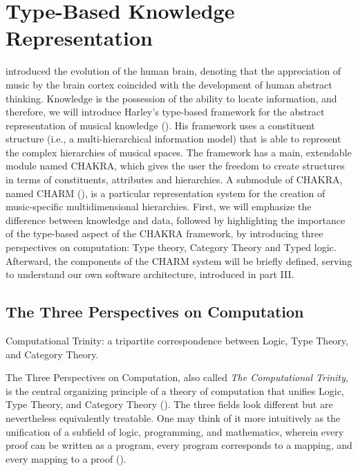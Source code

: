 \setlength{\headheight}{23.84448pt}
\addtolength{\topmargin}{-10.84448pt}

\chapter{Type-Based Knowledge Representation}
\label{chap:knowledge}

\textcite{shi_cognitive_2019} introduced the evolution of the human brain, denoting that the appreciation of music by the brain cortex coincided with the development of human abstract thinking.
Knowledge is the possession of the ability to locate information, and therefore, we will introduce Harley's type-based framework for the abstract representation of musical knowledge (\cite{harley_abstract_2020}).
His framework uses a constituent structure (i.e., a multi-hierarchical information model) that is able to represent the complex hierarchies of musical spaces. The framework has a main, extendable module named CHAKRA, which gives the user the freedom to create structures in terms of constituents, attributes and hierarchies. A submodule of CHAKRA, named CHARM (\cite{wiggins_representing_1989}), is a particular representation system for the creation of music-specific multidimensional hierarchies. First, we will emphasize the difference between knowledge and data, followed by highlighting the importance of the type-based aspect of the CHAKRA framework, by introducing three perspectives on computation: Type theory, Category Theory and Typed logic. Afterward, the components of the CHARM system will be briefly defined, serving to understand our own software architecture, introduced in part III.


\section{The Three Perspectives on Computation}

\begin{marginfigure}
    \centering
    
    \vspace{0.5cm}
    \caption{Computational Trinity: a tripartite correspondence between Logic, Type Theory, and Category Theory.}
    \label{typeTheory}
\end{marginfigure}

The Three Perspectives on Computation, also called \textit{The Computational Trinity}, is the central organizing principle of a theory of computation that unifies Logic, Type Theory, and Category Theory (\cite{eades_type_2012, goguen_categorical_1991}). The three fields look different but are nevertheless equivalently treatable. One may think of it more intuitively as the unification of a subfield of logic, programming, and mathematics, wherein every proof can be written as a program, every program corresponds to a mapping, and every mapping to a proof (\cite{harper_holy_2011}). 

